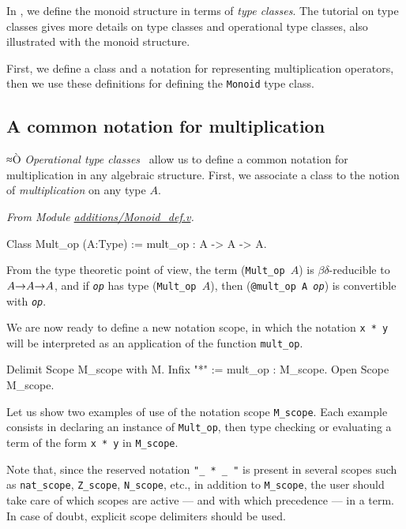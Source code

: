 In \coq{}, we define the monoid structure in terms of 
\emph{type classes}\cite{MS08,BS2011}. The tutorial on type classes \cite{PCMS} gives more details on type classes and
operational type classes, also illustrated with the monoid structure.


First, we define a class and a notation for representing multiplication operators, then we use
these definitions for defining the \texttt{Monoid} type class.

\subsection{A common notation for multiplication}
\label{op-classes}
≈Ò
\emph{Operational type classes}~\cite{BS2011}
allow us to define a common notation 
for multiplication in any algebraic structure. 
First, we associate a class to the notion of \emph{multiplication} 
on any type $A$.

\emph{From Module \href{../theories/html/additions.Monoid_def.html}{additions/Monoid\_def.v}.}

\begin{Coqsrc}
Class Mult_op (A:Type) := mult_op : A -> A -> A.  
\end{Coqsrc}

From the type theoretic point of view, the term (\texttt{Mult\_op $A$}) is 
$\beta\delta$-reducible to \texttt{$A\mbox{$\rightarrow$} A \mbox{$\rightarrow$} A$}, and
if \texttt{\it op} has type (\texttt{Mult\_op $A$}), then 
(\texttt{@mult\_op A {\it op}}) is convertible with \texttt{\it op}.

We are now ready to define a new notation scope, in which the notation
\texttt{x * y} will be interpreted as an application of the function
\texttt{mult\_op}.

\begin{Coqsrc}
Delimit Scope M_scope with M.
Infix "*" := mult_op : M_scope.
Open Scope M_scope.  
\end{Coqsrc}

 Let us show two examples of use of the
notation scope \texttt{M\_scope}. Each example consists in declaring an 
instance of \texttt{Mult\_op}, then type checking or evaluating
a term of the form \texttt{x * y} in \texttt{M\_scope}.

Note that, since the reserved notation \texttt{"\_ * \_ "} is 
present in several scopes such as  \texttt{nat\_scope}, \texttt{Z\_scope},
\texttt{N\_scope}, etc., in addition to  \texttt{M\_scope},  the user should
take care of which scopes are active --- and with  which precedence --- in a \gallina{} term.
In case of doubt, explicit scope delimiters should be used.
  




